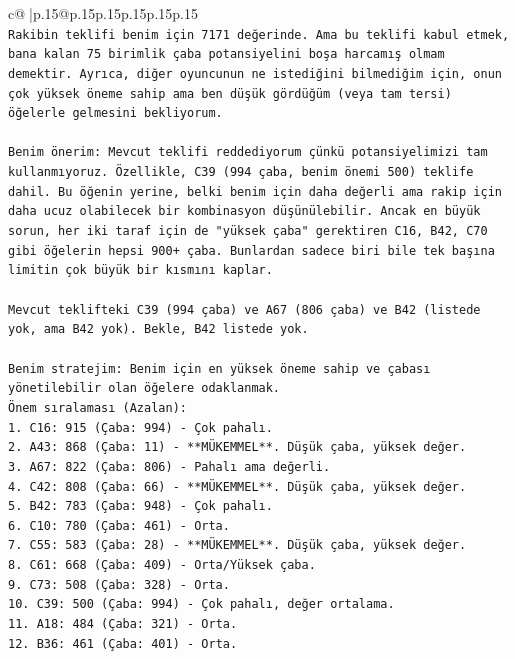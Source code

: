 \documentclass{article}
\begin{document}
{\begin{supertabular}{c@{$\;$}|p{.15\linewidth}@{}p{.15\linewidth}p{.15\linewidth}p{.15\linewidth}p{.15\linewidth}p{.15\linewidth}}
{{{\\ 
\texttt{Rakibin teklifi benim için 7171 değerinde. Ama bu teklifi kabul etmek, bana kalan 75 birimlik çaba potansiyelini boşa harcamış olmam demektir. Ayrıca, diğer oyuncunun ne istediğini bilmediğim için, onun çok yüksek öneme sahip ama ben düşük gördüğüm (veya tam tersi) öğelerle gelmesini bekliyorum.} \\
\\ 
\texttt{Benim önerim: Mevcut teklifi reddediyorum çünkü potansiyelimizi tam kullanmıyoruz. Özellikle, C39 (994 çaba, benim önemi 500) teklife dahil. Bu öğenin yerine, belki benim için daha değerli ama rakip için daha ucuz olabilecek bir kombinasyon düşünülebilir. Ancak en büyük sorun, her iki taraf için de "yüksek çaba" gerektiren C16, B42, C70 gibi öğelerin hepsi 900+ çaba. Bunlardan sadece biri bile tek başına limitin çok büyük bir kısmını kaplar.} \\
\\ 
\texttt{Mevcut teklifteki C39 (994 çaba) ve A67 (806 çaba) ve B42 (listede yok, ama B42 yok). Bekle, B42 listede yok.} \\
\\ 
\texttt{Benim stratejim: Benim için en yüksek öneme sahip ve çabası yönetilebilir olan öğelere odaklanmak.} \\
\texttt{Önem sıralaması (Azalan):} \\
\texttt{1. C16: 915 (Çaba: 994) {-} Çok pahalı.} \\
\texttt{2. A43: 868 (Çaba: 11) {-} **MÜKEMMEL**. Düşük çaba, yüksek değer.} \\
\texttt{3. A67: 822 (Çaba: 806) {-} Pahalı ama değerli.} \\
\texttt{4. C42: 808 (Çaba: 66) {-} **MÜKEMMEL**. Düşük çaba, yüksek değer.} \\
\texttt{5. B42: 783 (Çaba: 948) {-} Çok pahalı.} \\
\texttt{6. C10: 780 (Çaba: 461) {-} Orta.} \\
\texttt{7. C55: 583 (Çaba: 28) {-} **MÜKEMMEL**. Düşük çaba, yüksek değer.} \\
\texttt{8. C61: 668 (Çaba: 409) {-} Orta/Yüksek çaba.} \\
\texttt{9. C73: 508 (Çaba: 328) {-} Orta.} \\
\texttt{10. C39: 500 (Çaba: 994) {-} Çok pahalı, değer ortalama.} \\
\texttt{11. A18: 484 (Çaba: 321) {-} Orta.} \\
\texttt{12. B36: 461 (Çaba: 401) {-} Orta.} \\
}}}
\end{supertabular}}
\end{document}
